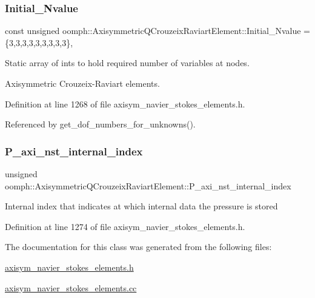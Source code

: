 \subsubsection{\texorpdfstring{Initial\+\_\+\+Nvalue}{Initial\_Nvalue}}
{\footnotesize\ttfamily const unsigned oomph\+::\+Axisymmetric\+Q\+Crouzeix\+Raviart\+Element\+::\+Initial\+\_\+\+Nvalue =\{3,3,3,3,3,3,3,3,3\}\hspace{0.3cm}{\ttfamily [static]}, {\ttfamily [private]}}



Static array of ints to hold required number of variables at nodes. 

Axisymmetric Crouzeix-\/\+Raviart elements. 

Definition at line 1268 of file axisym\+\_\+navier\+\_\+stokes\+\_\+elements.\+h.



Referenced by get\+\_\+dof\+\_\+numbers\+\_\+for\+\_\+unknowns().

\mbox{\label{classoomph_1_1AxisymmetricQCrouzeixRaviartElement_a8ec7b0e02c2ab96d0cb9b5238b76b145}} 
\subsubsection{\texorpdfstring{P\+\_\+axi\+\_\+nst\+\_\+internal\+\_\+index}{P\_axi\_nst\_internal\_index}}
{\footnotesize\ttfamily unsigned oomph\+::\+Axisymmetric\+Q\+Crouzeix\+Raviart\+Element\+::\+P\+\_\+axi\+\_\+nst\+\_\+internal\+\_\+index\hspace{0.3cm}{\ttfamily [protected]}}

Internal index that indicates at which internal data the pressure is stored 

Definition at line 1274 of file axisym\+\_\+navier\+\_\+stokes\+\_\+elements.\+h.



The documentation for this class was generated from the following files\+:\begin{DoxyCompactItemize}
\item 
\hyperlink{axisym__navier__stokes__elements_8h}{axisym\+\_\+navier\+\_\+stokes\+\_\+elements.\+h}\item 
\hyperlink{axisym__navier__stokes__elements_8cc}{axisym\+\_\+navier\+\_\+stokes\+\_\+elements.\+cc}\end{DoxyCompactItemize}
